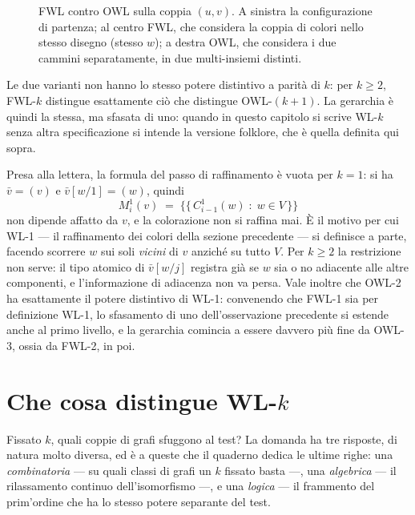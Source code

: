\begin{figure}[H]
  \centering
  
  \caption{FWL contro OWL sulla coppia $(u,v)$. A sinistra la configurazione di
  partenza; al centro FWL, che considera la coppia di colori nello stesso disegno
  (stesso $w$); a destra OWL, che considera i due cammini separatamente, in due
  multi-insiemi distinti.}
  \label{fig:fwl-owl}
\end{figure}

\begin{osservazione}
  Le due varianti non hanno lo stesso potere distintivo a parità di $k$: per $k \ge 2$,
  FWL-$k$ distingue esattamente ciò che distingue OWL-$(k+1)$. La gerarchia è quindi la
  stessa, ma sfasata di uno: quando in questo capitolo si scrive WL-$k$ senza altra
  specificazione si intende la versione folklore, che è quella definita qui sopra.
\end{osservazione}

\begin{osservazione}[Il caso $k = 1$ va letto a parte]
  Presa alla lettera, la formula del passo di raffinamento è vuota per $k = 1$: si ha
  $\bar v = (v)$ e $\bar v[w/1] = (w)$, quindi
  \[
    M_i^{1}(v) \;=\; \bigl\{\!\bigl\{\, C_{i-1}^{1}(w) \;:\; w \in V \,\bigr\}\!\bigr\}
  \]
  non dipende affatto da $v$, e la colorazione non si raffina mai. È il motivo per cui
  WL-1 --- il raffinamento dei colori della sezione precedente --- si definisce a parte,
  facendo scorrere $w$ sui soli \emph{vicini} di $v$ anziché su tutto $V$. Per $k \ge 2$
  la restrizione non serve: il tipo atomico di $\bar v[w/j]$ registra già se $w$ sia o
  no adiacente alle altre componenti, e l'informazione di adiacenza non va persa.
  Vale inoltre che OWL-2 ha esattamente il potere distintivo di WL-1: convenendo che
  FWL-1 sia per definizione WL-1, lo sfasamento di uno dell'osservazione precedente si
  estende anche al primo livello, e la gerarchia comincia a essere davvero più fine da
  OWL-3, ossia da FWL-2, in poi.
\end{osservazione}

\section{Che cosa distingue WL-\texorpdfstring{$k$}{k}}

Fissato $k$, quali coppie di grafi sfuggono al test? La domanda ha tre risposte, di
natura molto diversa, ed è a queste che il quaderno dedica le ultime righe:
una \emph{combinatoria} --- su quali classi di grafi un $k$ fissato basta ---, una
\emph{algebrica} --- il rilassamento continuo dell'isomorfismo ---, e una \emph{logica}
--- il frammento del prim'ordine che ha lo stesso potere separante del test.

